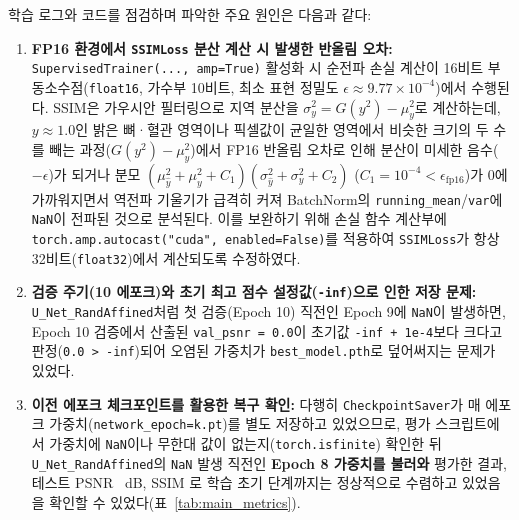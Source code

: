 \documentclass[10pt,a4paper]{article}
\begin{document}
학습 로그와 코드를 점검하며 파악한 주요 원인은 다음과 같다:
\begin{enumerate}
  \item \textbf{FP16 환경에서 \texttt{SSIMLoss} 분산 계산 시 발생한 반올림 오차:} \texttt{SupervisedTrainer(..., amp=True)} 활성화 시 순전파 손실 계산이 16비트 부동소수점(\texttt{float16}, 가수부 10비트, 최소 표현 정밀도 $\epsilon \approx 9.77\times 10^{-4}$)에서 수행된다. SSIM은 가우시안 필터링으로 지역 분산을 $\sigma_y^2 = G(y^2) - \mu_y^2$로 계산하는데, $y \approx 1.0$인 밝은 뼈·혈관 영역이나 픽셀값이 균일한 영역에서 비슷한 크기의 두 수를 빼는 과정($G(y^2) - \mu_y^2$)에서 FP16 반올림 오차로 인해 분산이 미세한 음수($-\epsilon$)가 되거나 분모 $(\mu_{\hat{y}}^2+\mu_y^2+C_1)(\sigma_{\hat{y}}^2+\sigma_y^2+C_2)$ ($C_1 = 10^{-4} < \epsilon_{\mathrm{fp16}}$)가 0에 가까워지면서 역전파 기울기가 급격히 커져 BatchNorm의 \texttt{running\_mean}/\texttt{var}에 \texttt{NaN}이 전파된 것으로 분석된다. 이를 보완하기 위해 손실 함수 계산부에 \texttt{torch.amp.autocast("cuda", enabled=False)}를 적용하여 \texttt{SSIMLoss}가 항상 32비트(\texttt{float32})에서 계산되도록 수정하였다.
  \item \textbf{검증 주기(10 에포크)와 초기 최고 점수 설정값(\texttt{-inf})으로 인한 저장 문제:} \texttt{U\_Net\_RandAffined}처럼 첫 검증(Epoch 10) 직전인 Epoch 9에 \texttt{NaN}이 발생하면, Epoch 10 검증에서 산출된 \texttt{val\_psnr = 0.0}이 초기값 \texttt{-inf + 1e-4}보다 크다고 판정(\texttt{0.0 > -inf})되어 오염된 가중치가 \texttt{best\_model.pth}로 덮어써지는 문제가 있었다.
  \item \textbf{이전 에포크 체크포인트를 활용한 복구 확인:} 다행히 \texttt{CheckpointSaver}가 매 에포크 가중치(\texttt{network\_epoch=k.pt})를 별도 저장하고 있었으므로, 평가 스크립트에서 가중치에 \texttt{NaN}이나 무한대 값이 없는지(\texttt{torch.isfinite}) 확인한 뒤 \texttt{U\_Net\_RandAffined}의 \texttt{NaN} 발생 직전인 \textbf{Epoch 8 가중치를 불러와} 평가한 결과, 테스트 PSNR \RandAffRecPSNR\ dB, SSIM \RandAffRecSSIM 로 학습 초기 단계까지는 정상적으로 수렴하고 있었음을 확인할 수 있었다(표~\ref{tab:main_metrics}).
\end{enumerate}
\end{document}
